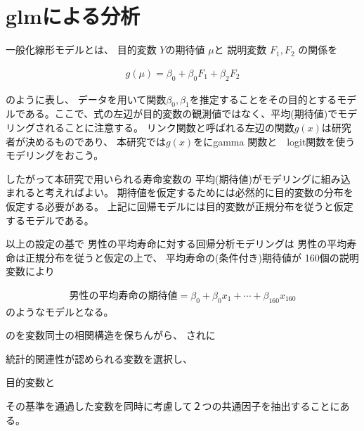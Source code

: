 \documentclass[a4j,11pt,mc]{jreport}
\begin{document}

%
%
%
%
%
%
%








\chapter{glmによる分析}\label{glm}



一般化線形モデルとは、
目的変数
$Y$の期待値
$\mu$と
説明変数
$F_1, F_2$
の関係を

\begin{eqnarray}
g(\mu)=\beta_0 +\beta_0F_1 + \beta_2 F_2
\end{eqnarray}


のように表し、
データを用いて関数$\beta_0 ,\beta_1 $を推定することをその目的とするモデルである。ここで、式の左辺が目的変数の観測値ではなく、平均(期待値)でモデリングされることに注意する。
リンク関数と呼ばれる左辺の関数$g(x)$は研究者が決めるものであり、
本研究では$g(x)$をにgamma 関数と　logit関数を使うモデリングをおこう。

したがって本研究で用いられる寿命変数の
平均(期待値)がモデリングに組み込まれると考えればよい。
期待値を仮定するためには必然的に目的変数の分布を仮定する必要がある。
上記に回帰モデルには目的変数が正規分布を従うと仮定するモデルである。

以上の設定の基で
男性の平均寿命に対する回帰分析モデリングは
男性の平均寿命は正規分布を従うと仮定の上で、
平均寿命の(条件付き)期待値が
160個の説明変数により

\begin{eqnarray}
\mbox{男性の平均寿命の期待値}=
\beta_0 +\beta_0x_1 +\cdots + \beta_{160} x_{160}
\end{eqnarray}
のようなモデルとなる。



のを変数同士の相関構造を保ちんがら、
されに

統計的関連性が認められる変数を選択し、


目的変数と





その基準を通過した変数を同時に考慮して２つの共通因子を抽出することにある。
\end{document}
